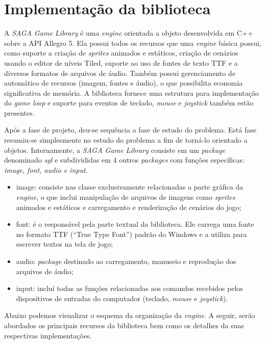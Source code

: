 \section{Implementação da biblioteca}
%
%
A \textit{SAGA Game Library} é uma \textit{engine} orientada a objeto desenvolvida em C++ sobre a API Allegro 5. Ela possui todos os recursos que uma \textit{engine} básica possui, como suporte a criação de \textit{sprites} animados e estáticos, criação de cenários usando o editor de níveis Tiled, suporte ao uso de fontes de texto TTF e a diversos formatos de arquivos de áudio. Também possui gerenciamento de automático de recursos (imagem, fontes e áudio), o que possibilita economia significativa de memória. A biblioteca fornece uma estrutura para implementação do \textit{game loop} e suporte para eventos de teclado, \textit{mouse} e \textit{joystick} também estão presentes. 
\par 
Após a fase de projeto, deu-se sequência a fase de estudo do problema. Está fase resumiu-se simplesmente no estudo do problema a fim de torná-lo orientado a objetos. Internamente, a \textit{SAGA Game Library} consiste em um \textit{package} denominado \textit{sgl} e subdivididas em 4 outros \textit{packages} com funções específicas: \textit{image, font, audio e input}.
%
%
\begin{itemize}
 \item image: consiste nas classe exclusivamente relacionadas a parte gráfica da \textit{engine}, o que inclui manipulação de arquivos de imagens como \textit{sprites} animados e estáticos e carregamento e renderização de cenários do jogo;
 \item font: é o responsável pela parte textual da biblioteca. Ele carrega uma fonte no formato TTF (``True Type Font'') padrão do Windows e a utiliza para escrever textos na tela de jogo;
 \item audio: \textit{package} destinado ao carregamento, manuseio e reprodução dos arquivos de áudio;
 \item input: incluí todas as funções relacionadas aos comandos recebidos pelos dispositivos de entradas do computador (teclado, \textit{mouse} e \textit{joystick}).
\end{itemize}
%
Abaixo podemos visualizar o esquema da organização da \textit{engine}. A seguir, serão abordados os principais recursos da biblioteca bem como os detalhes da suas respectivas implementações.
%
%
%
%
